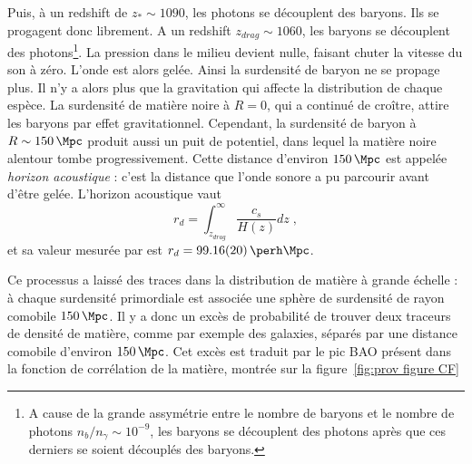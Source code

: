 \documentclass[11pt, twoside, a4paper, openright]{report}
\begin{document}
Puis, à un redshift de $z_{\ast} \sim 1090$, les photons se découplent des baryons. Ils se progagent donc librement.
A un redshift $z_{drag} \sim 1060$, les baryons se découplent des photons\footnote{A cause de la grande assymétrie entre le nombre de baryons et le nombre de photons $n_{b} / n_{\gamma} \sim 10^{-9}$, les baryons se découplent des photons après que ces derniers se soient découplés des baryons.}. La pression dans le milieu devient nulle, faisant chuter la vitesse du son à zéro. L'onde est alors gelée. Ainsi la surdensité de baryon ne se propage plus. Il n'y a alors plus que la gravitation qui affecte la distribution de chaque espèce.
La surdensité de matière noire à $R = 0$, qui a continué de croître, attire les baryons par effet gravitationnel. Cependant, la surdensité de baryon à $R \sim \SI{150}{\Mpc}$ produit aussi un puit de potentiel, dans lequel la matière noire alentour tombe progressivement.
Cette distance d'environ $\SI{150}{\Mpc}$ est appelée \emph{horizon acoustique} : c'est la distance que l'onde sonore a pu parcourir avant d'être gelée. L'horizon acoustique vaut
\begin{equation}
  \label{eq:sound_horizon}
  r_{d} = \int^{\infty}_{z_{drag}} \frac{c_{s}}{H(z)} dz  \; ,
\end{equation}
et sa valeur mesurée par \textcite{Collaboration2018} est $r_{d} = \SI{99.16(20)}{\perh\Mpc}$.

Ce processus a laissé des traces dans la distribution de matière à grande échelle : à chaque surdensité primordiale est associée une sphère de surdensité de rayon comobile $\SI{150}{\Mpc}$.
Il y a donc un excès de probabilité de trouver deux traceurs de densité de matière, comme par exemple des galaxies, séparés par une distance  comobile d'environ $\SI{150}{\Mpc}$.
Cet excès est traduit par le pic BAO présent dans la fonction de corrélation de la matière, montrée sur la figure~\ref{fig:prov figure CF}
\end{document}
